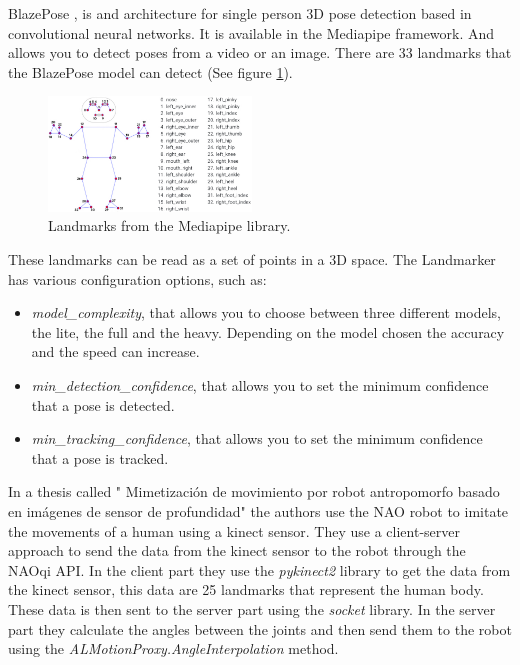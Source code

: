 \documentclass[conference]{IEEEtran}
\begin{document}
BlazePose \cite{b2}, is and architecture for single person 3D pose detection based in convolutional neural networks. It is available in the Mediapipe framework. And allows you to detect poses from a video or an image.
There are 33 landmarks that the BlazePose model can detect (See figure \ref{fig:landmarksMP}). 
\begin{figure}[htbp]
    \centerline{\includegraphics[width=0.48\textwidth]{images/landmarksMP.jpeg}}
    \caption{Landmarks from the Mediapipe library.}
    \label{fig:landmarksMP}
\end{figure}
These landmarks can be read as a set of points in a 3D space.
The Landmarker has various configuration options, such as:
\begin{itemize}
\item \textit{model\_complexity},  that allows you to choose between three different models, the lite, the full and the heavy. Depending on the model chosen the accuracy and the speed can increase.
\item \textit{min\_detection\_confidence}, that allows you to set the minimum confidence that a pose is detected.
\item \textit{min\_tracking\_confidence}, that allows you to set the minimum confidence that a pose is tracked.
\end{itemize}



In a thesis called "
Mimetización de movimiento por robot antropomorfo basado en imágenes de sensor de profundidad"\cite{b3} the authors use the NAO robot to imitate the movements of a human using a kinect sensor. 
They use a client-server approach to send the data from the kinect sensor to the robot through the NAOqi API.
In the client part they use the \textit{pykinect2} library to get the data from the kinect sensor, this data are 25 landmarks that represent the human body. These data is then sent to the server part using the \textit{socket} library.
In the server part they calculate the angles between the joints and then send them to the robot using the \textit{ALMotionProxy.AngleInterpolation} method.

\end{document}
